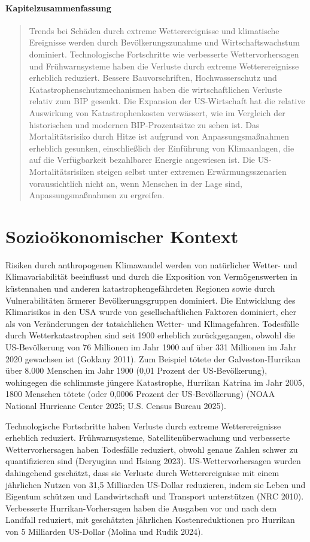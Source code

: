 \documentclass[12pt,paper=a4,DIV=12,parskip=never,chapterprefix=false,headings=standardclasses]{scrreprt}
\begin{document}
\paragraph{Kapitelzusammenfassung}
\begin{quote}
Trends bei Schäden durch extreme Wetterereignisse und klimatische Ereignisse werden durch Bevölkerungszunahme und Wirtschaftswachstum dominiert. Technologische Fortschritte wie verbesserte Wettervorhersagen und Frühwarnsysteme haben die Verluste durch extreme Wetterereignisse erheblich reduziert. Bessere Bauvorschriften, Hochwasserschutz und Katastrophenschutzmechanismen haben die wirtschaftlichen Verluste relativ zum BIP gesenkt. Die Expansion der US-Wirtschaft hat die relative Auswirkung von Katastrophenkosten verwässert, wie im Vergleich der historischen und modernen BIP-Prozentsätze zu sehen ist. Das Mortalitätsrisiko durch Hitze ist aufgrund von Anpassungsmaßnahmen erheblich gesunken, einschließlich der Einführung von Klimaanlagen, die auf die Verfügbarkeit bezahlbarer Energie angewiesen ist. Die US-Mortalitätsrisiken steigen selbst unter extremen Erwärmungsszenarien voraussichtlich nicht an, wenn Menschen in der Lage sind, Anpassungsmaßnahmen zu ergreifen.
\end{quote}

\section{Sozioökonomischer Kontext}
Risiken durch anthropogenen Klimawandel werden von natürlicher Wetter- und Klimavariabilität beeinflusst und durch die Exposition von Vermögenswerten in küstennahen und anderen katastrophengefährdeten Regionen sowie durch Vulnerabilitäten ärmerer Bevölkerungsgruppen dominiert. Die Entwicklung des Klimarisikos in den USA wurde von gesellschaftlichen Faktoren dominiert, eher als von Veränderungen der tatsächlichen Wetter- und Klimagefahren. Todesfälle durch Wetterkatastrophen sind seit 1900 erheblich zurückgegangen, obwohl die US-Bevölkerung von 76 Millionen im Jahr 1900 auf über 331 Millionen im Jahr 2020 gewachsen ist (Goklany 2011). Zum Beispiel tötete der Galveston-Hurrikan über 8.000 Menschen im Jahr 1900 (0,01 Prozent der US-Bevölkerung), wohingegen die schlimmste jüngere Katastrophe, Hurrikan Katrina im Jahr 2005, 1800 Menschen tötete (oder 0,0006 Prozent der US-Bevölkerung) (NOAA National Hurricane Center 2025; U.S. Census Bureau 2025).

Technologische Fortschritte haben Verluste durch extreme Wetterereignisse erheblich reduziert. Frühwarnsysteme, Satellitenüberwachung und verbesserte Wettervorhersagen haben Todesfälle reduziert, obwohl genaue Zahlen schwer zu quantifizieren sind (Deryugina und Hsiang 2023). US-Wettervorhersagen wurden dahingehend geschätzt, dass sie Verluste durch Wetterereignisse mit einem jährlichen Nutzen von 31,5 Milliarden US-Dollar reduzieren, indem sie Leben und Eigentum schützen und Landwirtschaft und Transport unterstützen (NRC 2010). Verbesserte Hurrikan-Vorhersagen haben die Ausgaben vor und nach dem Landfall reduziert, mit geschätzten jährlichen Kostenreduktionen pro Hurrikan von 5 Milliarden US-Dollar (Molina und Rudik 2024).
\end{document}
